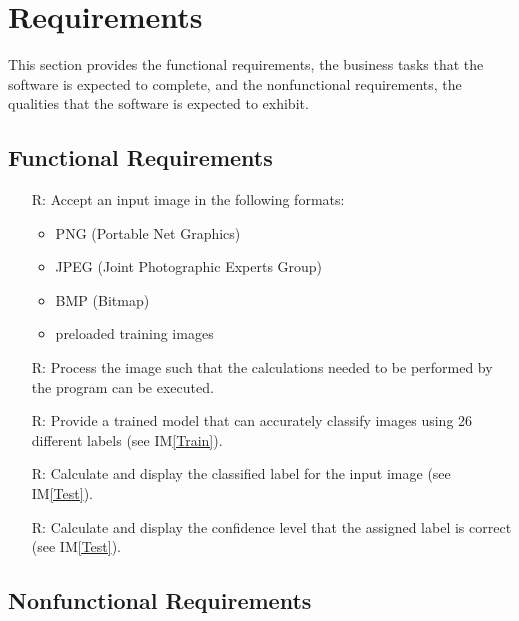 \documentclass[12pt]{article}
\newcommand{\iref}[1]{IM\ref{#1}}
\newcounter{reqnum} %
\begin{document}
\section{Requirements}

This section provides the functional requirements, the business tasks that the
software is expected to complete, and the nonfunctional requirements, the
qualities that the software is expected to exhibit.

\subsection{Functional Requirements}

\noindent \begin{itemize}

\item[R\refstepcounter{reqnum}\thereqnum \label{R1}:] Accept an input image in the following formats: \begin{itemize}
  \item PNG (Portable Net Graphics)
  \item JPEG (Joint Photographic Experts Group)
  \item BMP (Bitmap)
  \item preloaded training images
\end{itemize}

\item[R\refstepcounter{reqnum}\thereqnum \label{R2}:] Process the image such that the calculations
needed to be performed by the program can be executed.

\item[R\refstepcounter{reqnum}\thereqnum \label{R3}:] Provide a trained model that can accurately classify images using
26 different labels (see \iref{Train}).

\item[R\refstepcounter{reqnum}\thereqnum \label{R4}:] Calculate and display the classified label for the input image (see \iref{Test}).

\item[R\refstepcounter{reqnum}\thereqnum \label{R5}:] Calculate and display the confidence level that the assigned
label is correct (see \iref{Test}).

\end{itemize}

\subsection{Nonfunctional Requirements}
\end{document}
